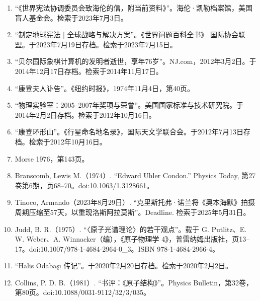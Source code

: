 \begin{enumerate}
\item “《世界宪法协调委员会致海伦的信，附当前资料》”。海伦·凯勒档案馆，美国盲人基金会。检索于2023年7月3日。
\item “制定地球宪法 | 全球战略与解决方案”。《世界问题百科全书》 国际协会联盟。于2023年7月19日存档。检索于2023年7月15日。
\item “贝尔国际象棋计算机的发明者逝世，享年76岁”。NJ.com，2012年3月2日。于2014年12月17日存档。检索于2014年11月17日。
\item “康登夫人讣告”。《纽约时报》，1974年11月4日，第40页。
\item “物理实验室：2005–2007年奖项与荣誉”。美国国家标准与技术研究院。于2014年2月2日存档。检索于2012年10月16日。
\item “康登环形山”。《行星命名地名录》，国际天文学联合会。于2012年7月13日存档。检索于2012年10月16日。
\item Morse 1976，第143页。
\item Branscomb, Lewis M.（1974）. “Edward Uhler Condon.” Physics Today, 第27卷第6期，页68–70。doi:10.1063/1.3128661。
\item Tinoco, Armando（2023年8月29日）. “克里斯托弗·诺兰将《奥本海默》拍摄周期压缩至57天，以重现洛斯阿拉莫斯”。Deadline. 检索于2025年5月31日。
\item Judd, B. R.（1975）. “〈原子光谱理论〉的若干观点”。载于 G. Putlitz、E. W. Weber、A. Winnacker（编），《原子物理学 4》，普雷纳姆出版社，页13–17。doi:10.1007/978-1-4684-2964-0_3。ISBN 978-1-4684-2966-4。
\item “Halis Odabaşı 传记”。于2020年2月20日存档。检索于2020年2月2日。
\item Collins, P. D. B.（1981）. “书评：《原子结构》”。Physics Bulletin，第32卷，第80页。doi:10.1088/0031-9112/32/3/035。

\end{enumerate}